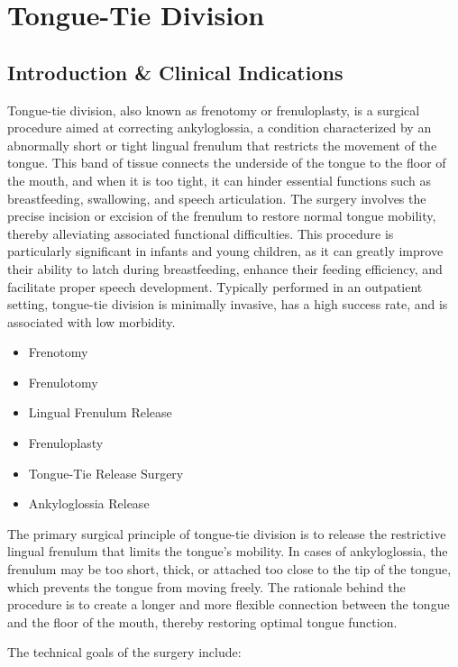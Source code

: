 \chapter{Tongue-Tie Division}

\section*{Introduction \& Clinical Indications}
Tongue-tie division, also known as frenotomy or frenuloplasty, is a surgical procedure aimed at correcting ankyloglossia, a condition characterized by an abnormally short or tight lingual frenulum that restricts the movement of the tongue. This band of tissue connects the underside of the tongue to the floor of the mouth, and when it is too tight, it can hinder essential functions such as breastfeeding, swallowing, and speech articulation. The surgery involves the precise incision or excision of the frenulum to restore normal tongue mobility, thereby alleviating associated functional difficulties. This procedure is particularly significant in infants and young children, as it can greatly improve their ability to latch during breastfeeding, enhance their feeding efficiency, and facilitate proper speech development. Typically performed in an outpatient setting, tongue-tie division is minimally invasive, has a high success rate, and is associated with low morbidity.

\begin{itemize}
  \item Frenotomy
  \item Frenulotomy
  \item Lingual Frenulum Release
  \item Frenuloplasty
  \item Tongue-Tie Release Surgery
  \item Ankyloglossia Release
\end{itemize}

The primary surgical principle of tongue-tie division is to release the restrictive lingual frenulum that limits the tongue's mobility. In cases of ankyloglossia, the frenulum may be too short, thick, or attached too close to the tip of the tongue, which prevents the tongue from moving freely. The rationale behind the procedure is to create a longer and more flexible connection between the tongue and the floor of the mouth, thereby restoring optimal tongue function.

The technical goals of the surgery include:

